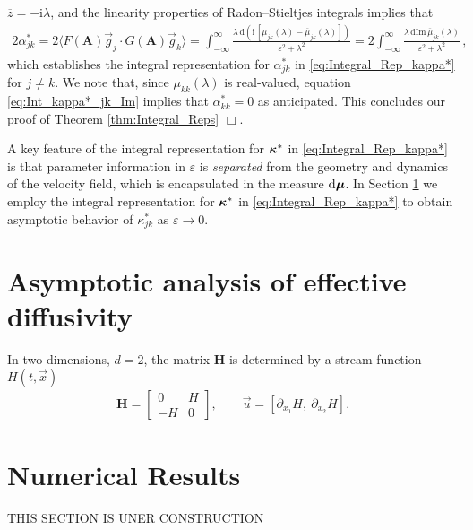 \documentclass[11pt]{amsart}
\newcommand{\I}{\mathrm{i}}
\renewcommand{\d}{\mathrm{d}}
\newcommand{\Hb}{\mathbf{H}}
\newcommand{\Ab}{\mathbf{A}}
\newcommand\bmu{\mbox{\boldmath${\mu}$}}
\newcommand\bkappa{\mbox{\boldmath${\kappa}$}}
\begin{document}
$\overline{z}=-\I\lambda$, and the linearity properties of Radon--Stieltjes
integrals \cite{Stone:64} implies that 
% 
\begin{align}\label{eq:Int_kappa*_jk_Im}
  2\alpha^*_{jk}=2\langle F(\Ab)\vec{g}_j\cdot G(\Ab)\vec{g}_k\rangle
       =\int_{-\infty}^\infty\frac{\lambda\,\d(\I\,[\mu_{jk}(\lambda)-\overline{\mu}_{jk}(\lambda)])}{\varepsilon^2+\lambda^2}
       =2\int_{-\infty}^\infty\frac{\lambda\,\d\text{Im}\,\overline{\mu}_{jk}(\lambda)}{\varepsilon^2+\lambda^2}\,,            
\end{align}
%
which establishes the integral representation for $\alpha^*_{jk}$ in
\eqref{eq:Integral_Rep_kappa*} for $j\neq k$. We note that, since
$\mu_{kk}(\lambda)$ is real-valued, equation \eqref{eq:Int_kappa*_jk_Im}
implies that $\alpha^*_{kk}=0$ as anticipated. This concludes our proof of
Theorem \ref{thm:Integral_Reps} $\Box$.
 



A key feature of the integral representation for $\bkappa^*$ in
\eqref{eq:Integral_Rep_kappa*} is that parameter information in $\varepsilon$ is
\emph{separated} from the geometry and dynamics of the velocity field,
which is encapsulated in the measure $\d\bmu$. In Section 
\ref{sec:Assymptotics} we employ the integral representation for
$\bkappa^*$ in \eqref{eq:Integral_Rep_kappa*} to obtain asymptotic
behavior of $\kappa^*_{jk}$ as $\varepsilon\to0$. 









\section{Asymptotic analysis of effective
  diffusivity} \label{sec:Assymptotics} 
In two dimensions, $d=2$, the matrix $\Hb$ is determined by a stream
function $H(t,\vec{x})$ 
%
\begin{align}\label{eq:u_H}  
  \Hb=\left[
  \begin{array}{cc}
    0  & H\\
    -H & 0
  \end{array}
  \right],
  \qquad
  \vec{u}=[\partial_{x_1}H, \ \partial_{x_2}H].
\end{align}
%


\section{Numerical Results}\label{sec:Num_Results}
%
THIS SECTION IS UNER CONSTRUCTION
\end{document}
